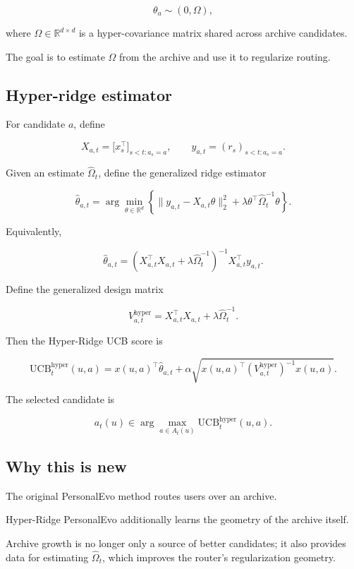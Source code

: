 \documentclass{article} %
\begin{document}
\[
\theta_a \sim (0, \Omega),
\]

where $\Omega \in \mathbb{R}^{d \times d}$ is a hyper-covariance matrix shared
across archive candidates.

The goal is to estimate $\Omega$ from the archive and use it to regularize
routing.

\subsection{Hyper-ridge estimator}

For candidate $a$, define

\[
X_{a,t} = \bigl[ x_s^\top \bigr]_{s < t : a_s = a}, \qquad
y_{a,t} = (r_s)_{s < t : a_s = a}.
\]

Given an estimate $\widehat{\Omega}_t$, define the generalized ridge estimator

\[
\widehat{\theta}_{a,t}
= \arg\min_{\theta \in \mathbb{R}^d}
\left\{ \| y_{a,t} - X_{a,t}\theta \|_2^2
      + \lambda \theta^\top \widehat{\Omega}_t^{-1} \theta \right\}.
\]

Equivalently,

\[
\widehat{\theta}_{a,t}
= \left( X_{a,t}^\top X_{a,t} + \lambda \widehat{\Omega}_t^{-1} \right)^{-1}
  X_{a,t}^\top y_{a,t}.
\]

Define the generalized design matrix

\[
V_{a,t}^{\mathrm{hyper}} = X_{a,t}^\top X_{a,t} + \lambda \widehat{\Omega}_t^{-1}.
\]

Then the Hyper-Ridge UCB score is

\[
\mathrm{UCB}_t^{\mathrm{hyper}}(u, a)
= x(u, a)^\top \widehat{\theta}_{a,t}
+ \alpha \sqrt{ x(u, a)^\top \left( V_{a,t}^{\mathrm{hyper}} \right)^{-1} x(u, a) }.
\]

The selected candidate is

\[
a_t(u) \in \arg\max_{a \in A_t(u)} \mathrm{UCB}_t^{\mathrm{hyper}}(u, a).
\]

\subsection{Why this is new}

The original PersonalEvo method routes users over an archive.

Hyper-Ridge
PersonalEvo additionally learns the geometry of the archive itself.

Archive
growth is no longer only a source of better candidates; it also provides data
for estimating $\widehat{\Omega}_t$, which improves the router's
regularization geometry.
\end{document}
